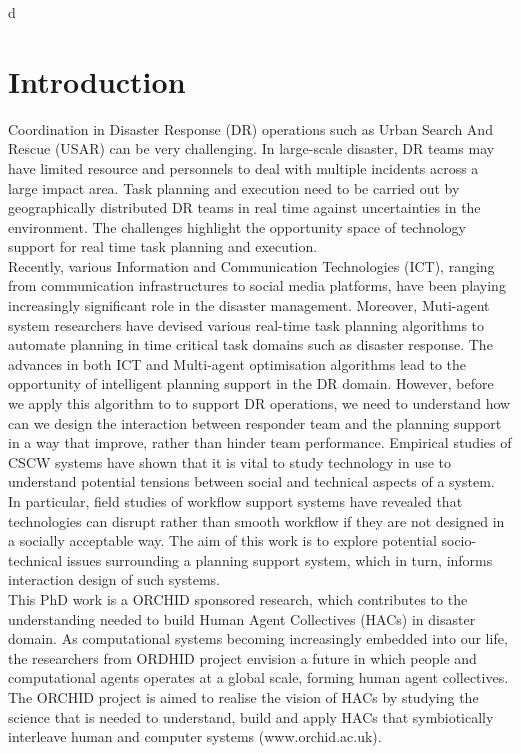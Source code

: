 d\chapter{Introduction}\label{ch:introduction}
Coordination in Disaster Response (DR) operations such as Urban Search And Rescue (USAR) can be very challenging. In large-scale disaster, DR teams may have limited resource and personnels to deal with multiple incidents across a large impact area. Task planning and execution need to be carried out by geographically distributed DR teams in real time against uncertainties in the environment. The challenges highlight the opportunity space of technology support for real time task planning and execution.  \\ 

Recently, various Information and Communication Technologies (ICT), ranging from communication infrastructures to social media platforms, have been playing increasingly significant role in the disaster management.  Moreover, Muti-agent system researchers have devised various real-time task planning algorithms to automate planning in time critical task domains such as disaster response. The advances in both ICT and Multi-agent optimisation algorithms lead to the opportunity of intelligent planning support in the DR domain. However, before we apply this algorithm to to support DR operations, we need to understand how can we design the interaction between responder team and the planning support in a way that improve, rather than hinder team performance. Empirical studies of CSCW systems have shown that it is vital to study technology in use to understand potential tensions between social and technical aspects of a system. In particular, field studies of workflow support systems have revealed that technologies can disrupt rather than smooth workflow if they are not designed in a socially acceptable way. The aim of this work is to explore potential socio-technical issues surrounding a planning support system, which in turn, informs interaction design of such systems. \\

This PhD work is a ORCHID sponsored research, which contributes to the understanding needed to build Human Agent Collectives (HACs) in disaster domain. As computational systems  becoming increasingly embedded into our life, the researchers from ORDHID project envision a future in which people and computational agents operates at a global scale, forming human agent collectives. The ORCHID project is aimed to realise the vision of HACs by studying the science that is needed to understand, build and apply HACs that symbiotically interleave human and computer systems (www.orchid.ac.uk).\\

